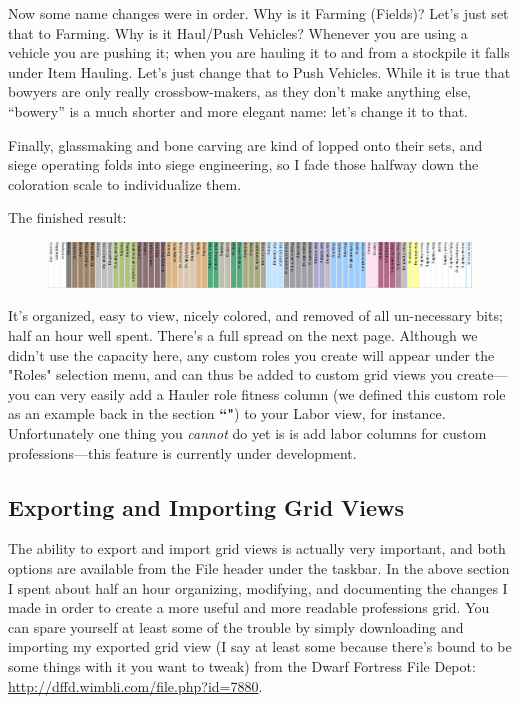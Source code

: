 \documentclass[]{article}
\begin{document}
Now some name changes were in order. Why is it Farming (Fields)? Let's just set that to Farming. Why is
it Haul/Push Vehicles? Whenever you are using a vehicle you are pushing it; when you are hauling it to
and from a stockpile it falls under Item Hauling. Let's just change that to Push Vehicles. While it is
true that bowyers are only really crossbow-makers, as they don't make anything else, ``bowery'' is a
much shorter and more elegant name: let's change it to that.
\vspace{12pt}

Finally, glassmaking and bone carving are kind of lopped onto their sets, and siege
operating folds into siege engineering, so I fade those halfway down the coloration scale to
individualize them.\vspace{12pt}

The finished result:
\begin{figure}[h!]
\centering \includegraphics[width=\linewidth]{Sec3Fig26}
\end{figure}

It's organized, easy to view, nicely colored, and removed of all un-necessary bits; half an hour well
spent. There's a full spread on the next page. Although we didn't use the capacity here, any custom roles
you create will appear under the "Roles" selection menu, and can thus be added to custom grid views you
create---you can very easily add a Hauler role fitness column (we defined this custom role as an example
back in the section \textbf{``"}) to your Labor view, for instance.
Unfortunately one thing you \emph{cannot} do yet is is add labor columns for custom professions---this
feature is currently under development.

\subsection{Exporting and Importing Grid Views}
\label{sec:Exporting and Importing Grid Views}

The ability to export and import grid views is actually very important, and both options are available
from the File header under the taskbar. In the above section I spent about half an hour organizing,
modifying, and documenting the changes I made in order to create a more useful and more readable
professions grid. You can spare yourself at least some of the trouble by simply downloading and importing
my exported grid view (I say at least some because there's bound to be some things with it you want to
tweak) from the Dwarf Fortress File Depot: \url{http://dffd.wimbli.com/file.php?id=7880}.
\end{document}
